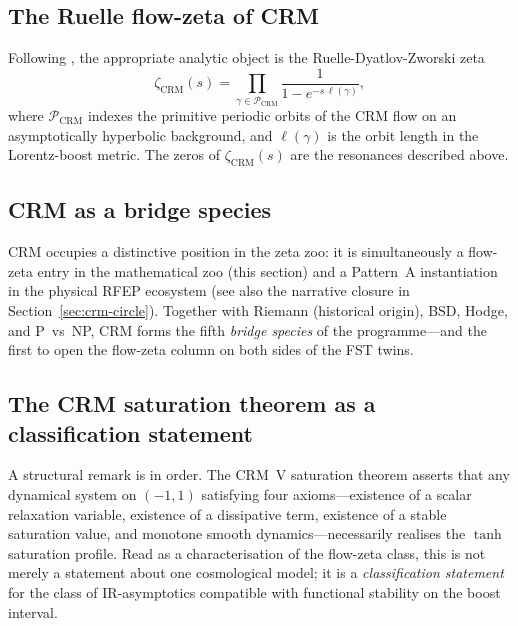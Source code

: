 \documentclass[11pt]{article}
\theoremstyle{definition}
\theoremstyle{remark}
\begin{document}
\subsection{The Ruelle flow-zeta of CRM}

Following \cite{DyatlovZworski2019}, the appropriate analytic object
is the Ruelle-Dyatlov-Zworski zeta
\begin{equation}
\label{eq:crm-flow-zeta}
  \zeta_{\mathrm{CRM}}(s)
  = \prod_{\gamma \in \mathcal{P}_{\mathrm{CRM}}}
    \frac{1}{1 - e^{-s\,\ell(\gamma)}},
\end{equation}
where $\mathcal{P}_{\mathrm{CRM}}$ indexes the primitive periodic
orbits of the CRM flow on an asymptotically hyperbolic background,
and $\ell(\gamma)$ is the orbit length in the Lorentz-boost metric.
The zeros of $\zeta_{\mathrm{CRM}}(s)$ are the resonances described
above.

\subsection{CRM as a bridge species}

CRM occupies a distinctive position in the zeta zoo: it is
simultaneously a flow-zeta entry in the mathematical zoo (this
section) and a Pattern~A instantiation in the physical RFEP
ecosystem \cite{RFEPFramework} (see also the narrative closure in
Section~\ref{sec:crm-circle}). Together with Riemann (historical
origin), BSD, Hodge, and P~vs~NP, CRM forms the fifth
\emph{bridge species} of the programme---and the first to open the
flow-zeta column on both sides of the FST twins.

\subsection{The CRM saturation theorem as a classification
statement}
\label{sec:crm-saturation-classification}

A structural remark is in order. The CRM~V saturation theorem
\cite{CRMV} asserts that any dynamical system on $(-1,1)$ satisfying
four axioms---existence of a scalar relaxation variable, existence of
a dissipative term, existence of a stable saturation value, and
monotone smooth dynamics---necessarily realises the $\tanh$ saturation
profile. Read as a characterisation of the flow-zeta class, this is
not merely a statement about one cosmological model; it is a
\emph{classification statement} for the class of IR-asymptotics
compatible with functional stability on the boost interval.
\end{document}

